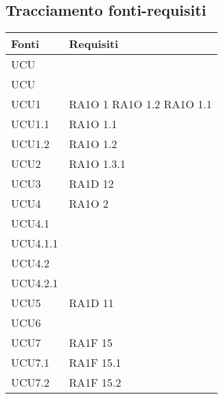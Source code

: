 \subsection{Tracciamento fonti-requisiti}
      \begin{center}
      \bgroup
      \def\arraystretch{1.8}
      \begin{longtable}{ | p{5cm} | p{5cm} |}
    
      \cellcolor[gray]{0.9} \textbf{Fonti} & \cellcolor[gray]{0.9} \textbf{Requisiti} \\ \hline       
            UCU &  \\ \hline      
            UCU &  \\ \hline      
            UCU1 &  RA1O 1 \newline  RA1O 1.2 \newline  RA1O 1.1 \newline  \\ \hline      
            UCU1.1 &  RA1O 1.1 \newline  \\ \hline      
            UCU1.2 &  RA1O 1.2 \newline  \\ \hline      
            UCU2 &  RA1O 1.3.1 \newline  \\ \hline      
            UCU3 &  RA1D 12 \newline  \\ \hline      
            UCU4 &  RA1O 2  \newline  \\ \hline      
            UCU4.1 &  \\ \hline      
            UCU4.1.1 &  \\ \hline      
            UCU4.2 &  \\ \hline      
            UCU4.2.1 &  \\ \hline      
            UCU5 &  RA1D 11 \newline  \\ \hline      
            UCU6 &  \\ \hline      
            UCU7 &  RA1F 15 \newline  \\ \hline      
            UCU7.1 &  RA1F 15.1 \newline  \\ \hline      
            UCU7.2 &  RA1F 15.2 \newline  \\ \hline      

\end{longtable}
\end{center}
